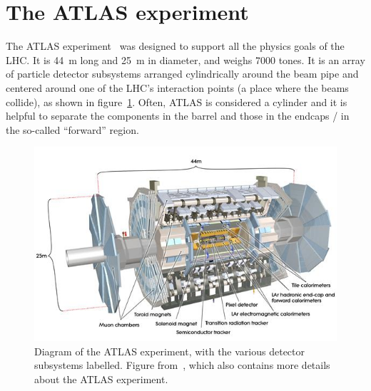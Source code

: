 

\section{The ATLAS experiment}
\label{sec:atlas}

The ATLAS experiment~\cite{collaboration_atlas_2008} was designed to support all the physics goals of the LHC. It is \SI{44}{\meter} long and \SI{25}{\meter} in diameter, and weighs 7000 tones. It is an array of particle detector subsystems arranged cylindrically around the beam pipe and centered around one of the LHC's interaction points (a place where the beams collide), as shown in figure~\ref{fig:atlas}. Often, ATLAS is considered a cylinder and it is helpful to separate the components in the barrel and those in the endcaps / in the so-called ``forward'' region.

\begin{figure}
    \centering
    \includegraphics[width = \textwidth]{figures/atlas_diagram.png}
    \caption{Diagram of the ATLAS experiment, with the various detector subsystems labelled. Figure from~\cite{collaboration_atlas_2008}, which also contains more details about the ATLAS experiment.}
    \label{fig:atlas}
\end{figure}

